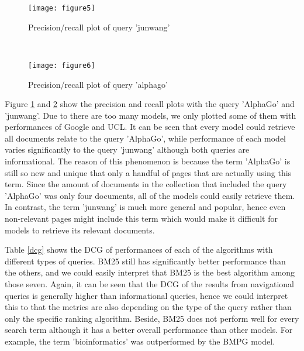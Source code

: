 \begin{figure*}[!t]
    \centering
    \begin{subfigure}{0.5\textwidth}
        \centering
        \texttt{[image: figure5]}
        \caption{Precision/recall plot of query 'junwang'}
        \label{fig:junwang}
        \vskip -6pt
    \end{subfigure}%
    ~ 
    \begin{subfigure}{0.5\textwidth}
        \centering
        \texttt{[image: figure6]}
        \caption{Precision/recall plot of query 'alphago'}
        \label{fig:alphago}
        \vskip -6pt
    \end{subfigure}
    \caption{Precision/recall curves for two example queries.}
\end{figure*}

Figure \ref{fig:junwang} and \ref{fig:alphago} show the precision and recall plots with the query 'AlphaGo' and 'junwang'. Due to there are too many models, we only plotted some of them with performances of Google and UCL. It can be seen that every model could retrieve all documents relate to the query 'AlphaGo', while performance of each model varies significantly to the query 'junwang' although both queries are informational. The reason of this phenomenon is because the term 'AlphaGo' is still so new and unique that only a handful of pages that are actually using this term. Since the amount of documents in the collection that included the query 'AlphaGo' was only four documents, all of the models could easily retrieve them. In contrast, the term 'junwang' is much more general and popular, hence even non-relevant pages might include this term which would make it difficult for models to retrieve its relevant documents.

Table \ref{dcg} shows the DCG of performances of each of the algorithms with different types of queries. BM25 still has significantly better performance than the others, and we could easily interpret that BM25 is the best algorithm among those seven. Again, it can be seen that the DCG of the results from navigational queries is generally higher than informational queries, hence we could interpret this to that the metrics are also depending on the type of the query rather than only the specific ranking algorithm. Beside, BM25 does not perform well for every search term although it has a better overall performance than other models. For example, the term 'bioinformatics' was outperformed by the BMPG model.

